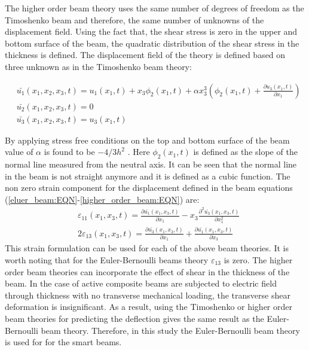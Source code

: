 The higher order beam theory uses the same number of degrees of freedom as the Timoshenko beam and therefore, the same number of unknowns of the displacement field.
Using the fact that, the shear stress is zero in the upper and bottom surface of the beam, the quadratic distribution of the shear stress in the thickness is defined.
The displacement field of the theory is defined based on three unknown as in the Timoshenko beam theory:

\begin{equation}
\begin{aligned}
& \bar {u_1} (x_1,x_2,x_3,t)=u_1 (x_1,t)+x_3  \phi_2(x_1,t) +\alpha x_3^3(\phi_2(x_1,t)+\frac{\partial u_3 (x_1,t)} {\partial x_1}) \\
& \bar {u_2} (x_1,x_2,x_3,t)=0 \\
& \bar {u_3} (x_1,x_2,x_3,t)=u_3 (x_1,t)
\end{aligned}
\label{higher_order_beam:EQN}
\end{equation}

By applying stress free conditions on the top and bottom surface of the beam value of $\alpha$ is found to be  $-4/3h^2$ \cite{Wang2000}.
Here $\phi_2(x_1,t)$ is defined as the slope of the normal line measured from the neutral axis.
It can be seen that the normal line in the beam is not straight anymore and it is defined as a cubic function.
The non zero strain component for the displacement defined in the beam equations (\ref{eluer_beam:EQN}-\ref{higher_order_beam:EQN}) are:
\begin{equation}
\begin{aligned}
& \varepsilon_{11} (x_1,x_3,t)=\frac{\partial    \bar {u_1} (x_1,x_3,t) } {\partial x_1} - x_3 \frac{\partial^2 \bar{ u_3} (x_1,x_3,t) } {\partial x_1^2} \\
& 2  \varepsilon_{13} (x_1,x_3,t)=\frac{\partial \bar {u_3} (x_1,x_3,t) } {\partial x_1} + \frac{\partial       \bar{ u_1} (x_1,x_3,t)} {\partial x_3}
\end{aligned}
\label{_strain_beam:EQN}
\end{equation}
This strain formulation can be used for each of the above beam theories.
It is worth noting that for the Euler-Bernoulli beams theory $\varepsilon_{13}$ is zero.
The higher order beam theories can incorporate the effect of shear in the thickness of the beam.
In the case of active composite beams are subjected to electric field through thickness with no transverse mechanical loading, the transverse shear deformation is insignificant.
As a result, using the Timoshenko or higher order beam theories for predicting the deflection gives the same result as the Euler-Bernoulli beam theory.
Therefore, in this study the Euler-Bernoulli beam theory is used for for the smart beams.



